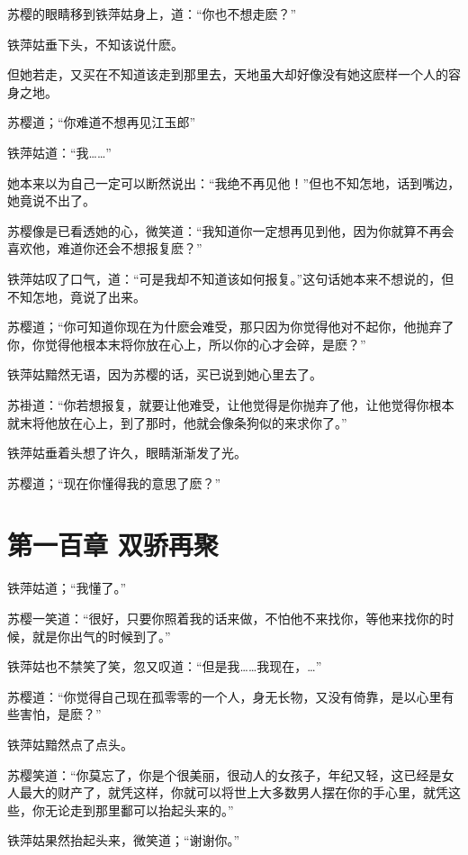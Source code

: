 \documentclass[12pt,oneside]{book}
\begin{document}
苏樱的眼睛移到铁萍姑身上，道：``你也不想走麽？''

铁萍姑垂下头，不知该说什麽。

但她若走，又买在不知道该走到那里去，天地虽大却好像没有她这麽样一个人的容身之地。

苏樱道；``你难道不想再见江玉郎''

铁萍姑道：``我\ldots\ldots{}''

她本来以为自己一定可以断然说出：``我绝不再见他！''但也不知怎地，话到嘴边，她竟说不出了。

苏樱像是已看透她的心，微笑道：``我知道你一定想再见到他，因为你就算不再会喜欢他，难道你还会不想报复麽？''

铁萍姑叹了口气，道：``可是我却不知道该如何报复。''这句话她本来不想说的，但不知怎地，竟说了出来。

苏樱道；``你可知道你现在为什麽会难受，那只因为你觉得他对不起你，他抛弃了你，你觉得他根本末将你放在心上，所以你的心才会碎，是麽？''

铁萍姑黯然无语，因为苏樱的话，买已说到她心里去了。

苏褂道：``你若想报复，就要让他难受，让他觉得是你抛弃了他，让他觉得你根本就末将他放在心上，到了那时，他就会像条狗似的来求你了。''

铁萍姑垂着头想了许久，眼睛渐渐发了光。

苏樱道；``现在你懂得我的意思了麽？''

\hypertarget{ux7b2cux4e00ux767eux7ae0-ux53ccux9a84ux518dux805a}{%
\chapter{第一百章
双骄再聚}\label{ux7b2cux4e00ux767eux7ae0-ux53ccux9a84ux518dux805a}}

铁萍姑道；``我懂了。''

苏樱一笑道：``很好，只要你照着我的话来做，不怕他不来找你，等他来找你的时候，就是你出气的时候到了。''

铁萍姑也不禁笑了笑，忽又叹道：``但是我\ldots\ldots 我现在，\ldots{}''

苏樱道：``你觉得自己现在孤零零的一个人，身无长物，又没有倚靠，是以心里有些害怕，是麽？''

铁萍姑黯然点了点头。

苏樱笑道：``你莫忘了，你是个很美丽，很动人的女孩子，年纪又轻，这已经是女人最大的财产了，就凭这样，你就可以将世上大多数男人摆在你的手心里，就凭这些，你无论走到那里鄱可以抬起头来的。''

铁萍姑果然抬起头来，微笑道；``谢谢你。''
\end{document}
